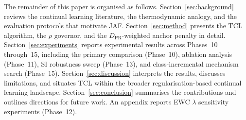 The remainder of this paper is organised as follows.
Section~\ref{sec:background} reviews the continual learning literature,
the thermodynamic analogy, and the evaluation protocols that motivate JAF.
Section~\ref{sec:method} presents the TCL algorithm, the $\rho$ governor,
and the $D_\text{PR}$-weighted anchor penalty in detail.
Section~\ref{sec:experiments} reports experimental results across Phases~10
through~15, including the primary comparison (Phase~10), ablation analysis
(Phase~11), SI robustness sweep (Phase~13), and class-incremental mechanism
search (Phase~15).
Section~\ref{sec:discussion} interprets the results, discusses limitations,
and situates TCL within the broader regularisation-based continual learning
landscape.
Section~\ref{sec:conclusion} summarises the contributions and outlines
directions for future work.
An appendix reports EWC $\lambda$ sensitivity experiments (Phase~12).

